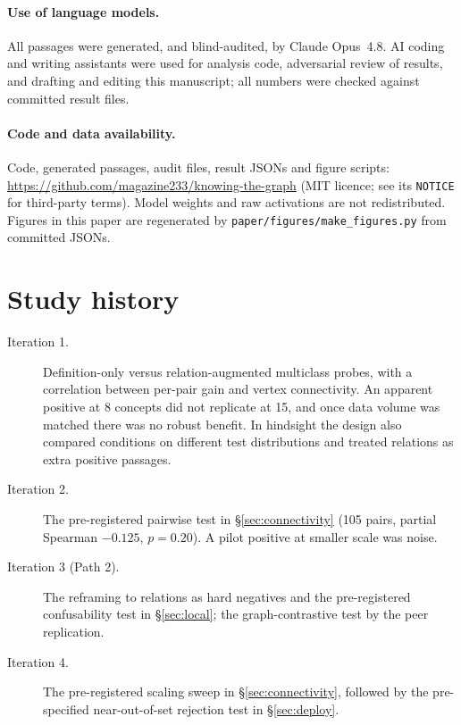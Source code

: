 \documentclass[11pt]{article}
\newcommand{\repo}{\url{https://github.com/magazine233/knowing-the-graph}}
\begin{document}
\paragraph{Use of language models.} All passages were generated, and blind-audited, by Claude Opus~4.8.
AI coding and writing assistants were used for analysis code, adversarial review of results, and drafting and
editing this manuscript; all numbers were checked against committed result files.

\paragraph{Code and data availability.} Code, generated passages, audit files, result JSONs and figure scripts:
\repo{} (MIT licence; see its \texttt{NOTICE} for third-party terms). Model weights and raw activations are not
redistributed. Figures in this paper are regenerated by \texttt{paper/figures/make\_figures.py} from committed
JSONs.




\appendix

\section{Study history}
\label{app:history}
\begin{description}
  \item[Iteration 1.] Definition-only versus relation-augmented multiclass probes, with a correlation between
        per-pair gain and vertex connectivity. An apparent positive at 8 concepts did not replicate at 15, and
        once data volume was matched there was no robust benefit. In hindsight the design also compared conditions
        on different test distributions and treated relations as extra positive passages.
  \item[Iteration 2.] The pre-registered pairwise test in \S\ref{sec:connectivity} (105 pairs, partial Spearman
        $-0.125$, $p=0.20$). A pilot positive at smaller scale was noise.
  \item[Iteration 3 (Path 2).] The reframing to relations as hard negatives and the pre-registered
        confusability test in \S\ref{sec:local}; the graph-contrastive test by the peer replication.
  \item[Iteration 4.] The pre-registered scaling sweep in \S\ref{sec:connectivity}, followed by the pre-specified
        near-out-of-set rejection test in \S\ref{sec:deploy}.
\end{description}
\end{document}
